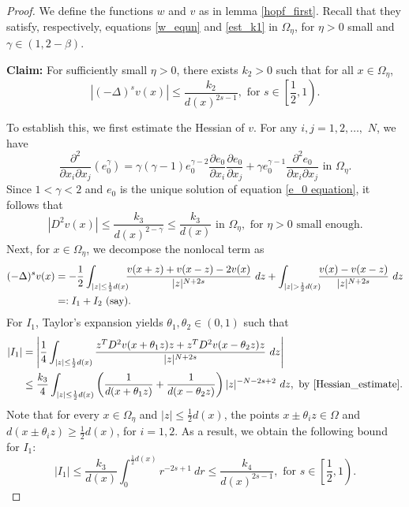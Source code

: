 \documentclass[reqno,oneside]{amsart}
\theoremstyle{definition}
\theoremstyle{remark}
\numberwithin{equation}{section}
\newcommand{\ba}{\beta}
\newcommand{\Om} {\Omega}
\newcommand{\pa}{\partial}
\newcommand{\De} {\Delta}
\begin{document}
\begin{proof}
    We define the functions $w$ and $v$ as in lemma \ref{hopf_first}. Recall that they satisfy, respectively, equations \eqref{w_equn} and \eqref{est_k1} in $\Om_{\eta}$, for $\eta>0$ small and $\gamma \in \left(1, 2- \ba\right)$.

    \noindent\textbf{Claim:} For sufficiently small $\eta>0$, there exists $k_2 >0$ such that for all $x\in \Om_{\eta}$,
    \[\left|(-\De)^s v (x)\right| \leq \frac{k_2}{d(x)^{2s-1}}, \text{ for } s\in \left[\frac{1}{2},1\right).\]

    To establish this, we first estimate the Hessian of $v$. For any $i,j= 1,2, \dots,$ $N$, we have
    \begin{equation*}
        \frac{\pa^2}{\pa x_i \pa x_j} \left(e_0^{\gamma}\right) = \gamma \left( \gamma -1 \right) e_0^{\gamma-2} \frac{\pa e_0}{\pa x_i} \frac{\pa e_0}{\pa x_j} + \gamma e_0^{\gamma-1} \frac{\pa^2 e_0}{\pa x_i \pa x_j} \text{ in } \Om_{\eta}.
    \end{equation*}
    Since $1< \gamma <2$ and $e_0$ is the unique solution of equation \eqref{e_0 equation}, it follows that
    \begin{equation}\label{Hessian_estimate}
        \left|D^2v (x)\right| \leq \frac{k_3}{d(x)^{2-\gamma}} \leq \frac{k_3}{d(x)} \text{ in } \Om_{\eta}, \text{ for } \eta>0 \text{ small enough}.
    \end{equation}
    Next, for $x\in \Om_{\eta}$, we decompose the nonlocal term as
    \begin{align}\label{est_nonlocal}
        (-\De)^s v (x) &= -\frac{1}{2} \int_{|z| \leq \frac{1}{2}d(x)} \hspace{-5pt} \frac{v(x+z) + v(x-z) - 2v(x)}{|z|^{N+2s}}\ dz + \int_{|z| > \frac{1}{2}d(x)} \hspace{-5pt} \frac{v(x) - v(x-z)}{|z|^{N+2s}}\ dz\nonumber\\
        &=: I_1 + I_2 \text{ (say)}.
    \end{align}
    For $I_1$, Taylor's expansion yields $\theta_1, \theta_2 \in (0,1)$ such that
    \begin{align*}
        |I_1| &= \left|\frac{1}{4} \int_{|z| \leq \frac{1}{2}d(x)} \frac{z^T D^2v (x+ \theta_1 z) z + z^T D^2v (x- \theta_2 z) z}{|z|^{N+2s}}\ dz \right|\\
        &\leq \frac{k_3}{4} \int_{|z| \leq \frac{1}{2}d(x)} \left( \frac{1}{d(x+ \theta_1 z)} + \frac{1}{d(x- \theta_2 z)} \right) |z|^{-N-2s+2}\ dz, \text{ by \eqref{Hessian_estimate}}.
    \end{align*}
    Note that for every $x\in \Om_{\eta}$ and $|z| \leq \frac{1}{2}d(x)$, the points $x\pm \theta_i z \in \Om$ and $d(x\pm \theta_i z) \geq \frac{1}{2}d(x)$, for $i=1,2$. As a result, we obtain the following bound for $I_1$:
    \begin{equation}\label{est_1}
        |I_1| \leq \frac{k_3}{d(x)} \int_0^{\frac{1}{2}d(x)} r^{-2s+1}\ dr \leq \frac{k_4}{d(x)^{2s-1}}, \text{ for } s\in \left[\frac{1}{2},1\right).
    \end{equation}


\end{proof}
\end{document}
